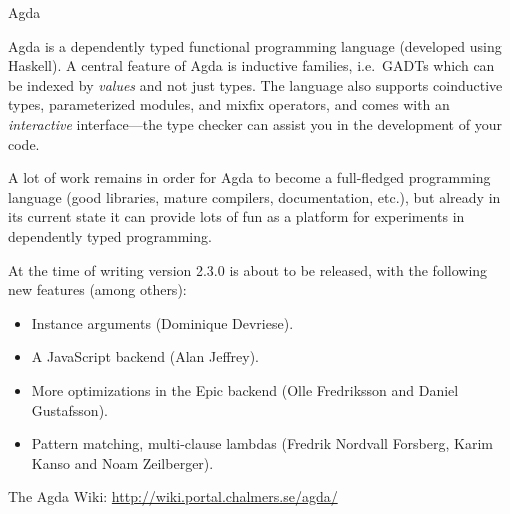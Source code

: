 \documentclass{article}
\begin{document}
\begin{hcarentry}{Agda}
\label{agda}
\makeheader

Agda is a dependently typed functional programming language (developed
using Haskell). A central feature of Agda is inductive families, i.e.\
GADTs which can be indexed by \emph{values} and not just types. The
language also supports coinductive types, parameterized modules, and
mixfix operators, and comes with an \emph{interactive} interface---the
type checker can assist you in the development of your code.

A lot of work remains in order for Agda to become a full-fledged
programming language (good libraries, mature compilers, documentation,
etc.), but already in its current state it can provide lots of fun as
a platform for experiments in dependently typed programming.

At the time of writing version 2.3.0 is about to be released, with the
following new features (among others):
\begin{itemize}
\item Instance arguments (Dominique Devriese).
\item A JavaScript backend (Alan Jeffrey).
\item More optimizations in the Epic backend (Olle Fredriksson and
  Daniel Gustafsson).
\item Pattern matching, multi-clause lambdas (Fredrik Nordvall
  Forsberg, Karim Kanso and Noam Zeilberger).
\end{itemize}

\FurtherReading
  The Agda Wiki: \url{http://wiki.portal.chalmers.se/agda/}
\end{hcarentry}
\end{document}
